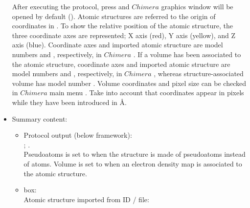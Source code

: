 \begin{itemize}
  After executing the protocol, press  and $Chimera$ graphics window will be opened by default (). 
  Atomic structures are referred to the origin of coordinates in \chimera. To show the relative position of the atomic structure, the three coordinate axes are represented; X axis (red), Y axis (yellow), and Z axis (blue). Coordinate axes and imported atomic structure are model numbers  and , respectively, in $Chimera$ . If a volume has been associated to the atomic structure, coordinate axes and imported atomic structure are model numbers  and , respectively, in $Chimera$ , whereas structure-associated volume has model number . Volume coordinates and pixel size can be checked in $Chimera$ main menu . Take into account that coordinates appear in pixels while they have been introduced in \AA.
   
   \item Summary content:
    \begin{itemize}
     \item Protocol output (below \scipion framework):\\ ; .\\Pseudoatoms is set to  when the structure is made of pseudoatoms instead of atoms. Volume is set to  when an electron density map is associated to the atomic structure.
     \item {} box:\\Atomic structure imported from ID / file: 
    \end{itemize}

  \end{itemize}
